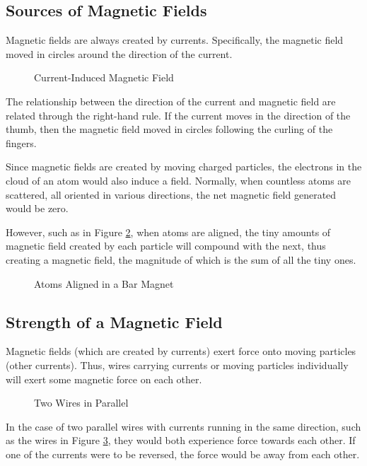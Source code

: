 \documentclass[12pt]{article}
\begin{document}
\subsection{Sources of Magnetic Fields}
\label{ssec:sourcesOfMagneticFields}

Magnetic fields are always created by currents. Specifically, the magnetic field moved in
circles around the direction of the current.
\begin{figure}[H]
  \centering
  
  \caption{Current-Induced Magnetic Field}
  \label{fig:040}
\end{figure}
The relationship between the direction of the
current and magnetic field are related through the right-hand rule. If the current moves
in the direction of the thumb, then the magnetic field moved in circles following the
curling of the fingers.

Since magnetic fields are created by moving charged particles, the electrons in the cloud
of an atom would also induce a field. Normally, when countless atoms are scattered, all
oriented in various directions, the net magnetic field generated would be zero.

However, such as in Figure \ref{fig:041}, when atoms are aligned, the tiny amounts of
magnetic field created by each particle will compound with the next, thus creating a
magnetic field, the magnitude of which is the sum of all the tiny ones.

\begin{figure}[H]
  \centering
  
  \caption{Atoms Aligned in a Bar Magnet}
  \label{fig:041}
\end{figure}

\subsection{Strength of a Magnetic Field}
\label{ssec:strengthOfAMagneticField}

Magnetic fields (which are created by currents) exert force onto moving particles (other
currents). Thus, wires carrying currents or moving particles individually will exert some
magnetic force on each other.

\begin{figure}[H]
  \centering
  
  \caption{Two Wires in Parallel}
  \label{fig:042}
\end{figure}
\vspace{-20pt}
In the case of two parallel wires with currents running in the same direction, such as the
wires in Figure \ref{fig:042}, they would both experience force towards each other. If one
of the currents were to be reversed, the force would be away from each other.
\end{document}
